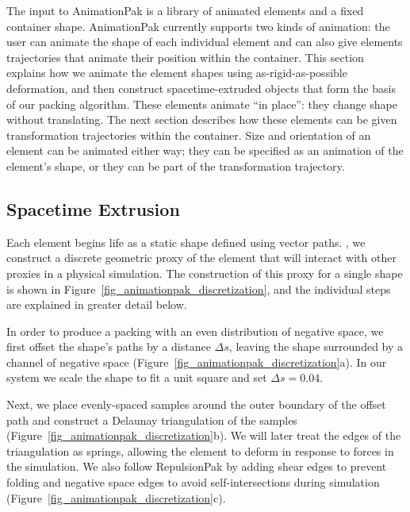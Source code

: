 The input to AnimationPak is a library of animated elements and a
fixed container shape.  AnimationPak currently supports two kinds
of animation: the user can animate the shape of each individual
element and can also give elements trajectories that animate
their position within the container.  This
section explains how we animate the element shapes using
as-rigid-as-possible deformation, and then construct
spacetime-extruded objects that form the basis of our packing
algorithm.  These elements animate ``in place'': they change
shape without translating. The next section describes how these
elements can be given transformation trajectories within the
container. Size and orientation of an element can be animated
either way; they can be specified as an animation of the element's
shape, or they can be part of the transformation trajectory.





\subsection{Spacetime Extrusion}
\label{animationpak_spacetime_extrusion}

Each element begins life as a static shape defined using
vector paths.  , we construct a discrete
geometric proxy of the element that will interact with other
proxies in a physical simulation.  The construction of this proxy
for a single shape is shown in Figure~\ref{fig_animationpak_discretization}, and
the individual steps are explained in greater detail below.

In order to produce a packing with an even distribution of negative
space, we first offset the shape's paths by a distance $\Delta s$,
leaving the shape surrounded by a channel of negative space
(Figure~\ref{fig_animationpak_discretization}a).  In our system
we scale the shape to fit a unit square and set $\Delta s=0.04$.

\newtext
{
Next, we place evenly-spaced samples around the outer boundary of 
the offset path and construct a Delaunay triangulation of the samples
(Figure~\ref{fig_animationpak_discretization}b). We will
later treat the edges of the triangulation as springs, allowing the
element to deform in response to forces in the simulation.  
We also follow RepulsionPak by adding shear edges to prevent
folding and negative space edges to avoid self-intersections during simulation
(Figure~\ref{fig_animationpak_discretization}c).
}

